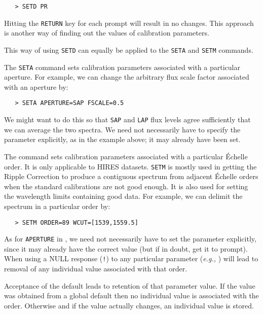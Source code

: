\begin{verbatim}
   > SETD PR
\end{verbatim}

Hitting the \verb+RETURN+ key for each prompt will result in no changes.  This
approach is another way of finding out the values of calibration parameters.

This way of using \verb+SETD+ can equally be applied to the \verb+SETA+ and
\verb+SETM+ commands.

The \verb+SETA+ command sets calibration parameters associated with a particular
aperture.  For example, we can change the arbitrary flux scale factor
associated with an aperture by:

\begin{verbatim}
   > SETA APERTURE=SAP FSCALE=0.5
\end{verbatim}

We might want to do this so that \verb+SAP+ and \verb+LAP+ flux levels agree
sufficiently that we can average the two spectra.  We need not
necessarily have to specify the 
 parameter explicitly, as in the
example above; it may already have been set.

The 
 command sets calibration parameters associated with a particular
\'{E}chelle order.  It is only applicable to HIRES datasets.  \verb+SETM+ is
mostly used in getting the Ripple Correction to produce a contiguous spectrum
from adjacent \'{E}chelle orders when the standard calibrations are not good
enough.  It is also used for setting the wavelength limits containing good data.
For example, we can delimit the spectrum in a particular order by:

\begin{verbatim}
   > SETM ORDER=89 WCUT=[1539,1559.5]
\end{verbatim}

As for \verb+APERTURE+ in 
, we need not necessarily have to set the
 parameter explicitly, since it may already have the correct value
(but if in doubt, get it to prompt)\@.  When using
 a NULL response
(\verb+!+) to any particular parameter ({\it{e.g.,}}
) will lead to
removal of any individual value associated with that order.

Acceptance of the default leads to retention of that parameter value. If the
value was obtained from a global default then no individual value is associated
with the order.  Otherwise and if the value actually changes, an individual
value is stored.

